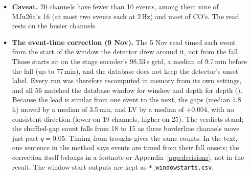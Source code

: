 \begin{instructions}
\begin{itemize}
\begin{itemize}
                after correction (LV), on every recording: M2\_aug 7 of 16, M2\_concat 2 of 15, LM 2 of 4, CO 1 of 2,
                MJu26a 3 of 7. The rate drifts slowly. One M2\_concat channel (CH7) goes the other way: long and short
                gaps alternate.
          \item \textbf{Caveat.} 20 channels have fewer than 10 events, among them nine of MJu26a's 16 (at most two
                events each at 2\,Hz) and most of CO's. The read rests on the busier channels.
          \item \textbf{The event-time correction (9 Nov).} The 5 Nov read timed each event from the start of the window
                the detector drew around it, not from the fall. Those starts sit on the stage encoder's 98.33\,s grid, a
                median of 9.7\,min before the fall (up to 77\,min), and the database does not keep the detector's onset
                label. Every run was therefore recomputed in memory from its own settings, and all 56 matched the
                database window for window and depth for depth (). Because the lead is
                similar from one event to the next, the gaps (median 1.8\,h) moved by a median of 3.5\,min, and LV by a
                median of $+0.004$, with no consistent direction (lower on 19 channels, higher on 25). The verdicts
                stand; the shuffled-gap count falls from 18 to 15 as three borderline channels move just past
                $q=0.05$. Timing from troughs gives the same counts. In the text, one sentence in the method says events
                are timed from their fall onsets; the correction itself belongs in a footnote or Appendix~\ref{app:decisions},
                not in the result. The window-start outputs are kept as \texttt{*\_windowstarts.csv}.
        \end{itemize}
\end{itemize}


\end{instructions}
